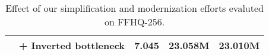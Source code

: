 \begin{wraptable}[21]{r}{8cm}
{\begin{tabular}{ l r c c c }
   & \textcolor[rgb]{0,0.502,0.502}{+ Inverted bottleneck}                                                                                                                                         & 7.045 & 23.058M & 23.010M  \\ 
\bottomrule
\end{tabular}
}
\vspace{-0.25cm}
\caption{Effect of our simplification and modernization efforts evaluted on FFHQ-256.} 
\label{tab:roadmap}
\end{wraptable}